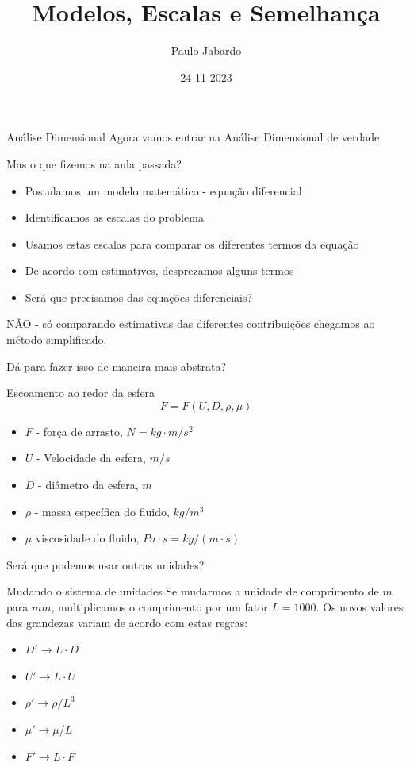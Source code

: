\documentclass{beamer}
\title{Modelos, Escalas e Semelhança}
\author{Paulo Jabardo}
\date{24-11-2023}
\newcommand{\lra}{\ensuremath{\longrightarrow}}
\begin{document}
\maketitle
\begin{frame}{Análise Dimensional}
  Agora vamos entrar na Análise Dimensional de verdade

  Mas o que fizemos na aula passada?
  \begin{itemize}
  \item Postulamos um modelo matemático - equação diferencial
  \item Identificamos as escalas do problema
  \item Usamos estas escalas para comparar os diferentes termos da equação
  \item De acordo com estimatives, desprezamos alguns termos
  \item Será que precisamos das equações diferenciais?
  \end{itemize}
  NÃO - só comparando estimativas das diferentes contribuições chegamos ao método simplificado.

  Dá para fazer isso de maneira mais abstrata? 
\end{frame}

\begin{frame}{Escoamento ao redor da esfera}
  \[
  F = F(U, D, \rho, \mu)
  \]
\begin{itemize}
\item $F$ - força de arrasto, $N=kg\cdot m/s^2$
\item $U$ - Velocidade da esfera, $m/s$
\item $D$ - diâmetro da esfera, $m$
\item $\rho$ - massa específica do fluido, $kg/m^3$
\item $\mu$ viscosidade do fluido, $Pa\cdot s = kg/(m\cdot s)$
\end{itemize}

Será que podemos usar outras unidades?

\end{frame}

\begin{frame}{Mudando o sistema de unidades}
  Se mudarmos a unidade de comprimento de $m$ para $mm$, multiplicamos o comprimento por um fator $L = 1000$. Os novos valores das grandezas variam de acordo com estas regras:
  
\begin{itemize}
\item $D' \lra L \cdot D$
\item $U' \lra L \cdot U$
\item $\rho' \lra  \rho / L^3$
\item $\mu' \lra \mu / L$
\item $F' \lra L \cdot F$
\end{itemize}
  
\end{frame}
\end{document}
